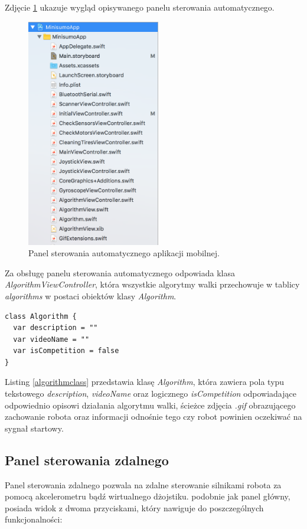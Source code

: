 Zdjęcie \ref{fig:automaticview} ukazuje wygląd opisywanego panelu sterowania automatycznego. 

\begin{figure}[H]
	\centering
		\includegraphics[width=0.75\linewidth, height=10cm, keepaspectratio]{pic05/structure.png}
	\caption{Panel sterowania automatycznego aplikacji mobilnej.}
	\label{fig:automaticview}	
\end{figure}

Za obsługę panelu sterowania automatycznego  odpowiada klasa 	\textit{AlgorithmViewController}, która wszystkie algorytmy walki przechowuje w tablicy \textit{algorithms} w postaci obiektów klasy \textit{Algorithm}.
  
\begin{minipage}{\textwidth}
	\begin{lstlisting}[label=algorithmclass,caption=Klasa Algorithm.]
class Algorithm {
  var description = ""
  var videoName = ""
  var isCompetition = false
}
	\end{lstlisting}
\end{minipage}

Listing \ref{algorithmclass} przedstawia klasę \textit{Algorithm}, która zawiera pola typu tekstowego \textit{description}, \textit{videoName} oraz logicznego \textit{isCompetition} odpowiadające odpowiednio opisowi działania algorytmu walki, ścieżce zdjęcia \textit{.gif} obrazującego zachowanie robota oraz informacji odnośnie tego czy robot powinien oczekiwać na sygnał startowy.
 
\subsection{Panel sterowania zdalnego}
Panel sterowania zdalnego pozwala na zdalne sterowanie silnikami robota za pomocą akcelerometru bądź wirtualnego dżojstiku. podobnie jak panel główny, posiada  widok z dwoma przyciskami, który nawiguje do poszczególnych funkcjonalności:
 
